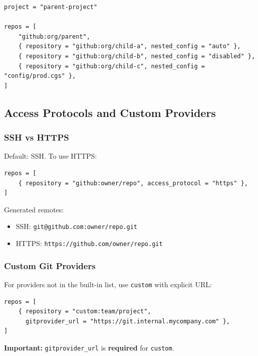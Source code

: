 \begin{lstlisting}
project = "parent-project"

repos = [
    "github:org/parent",
    { repository = "github:org/child-a", nested_config = "auto" },
    { repository = "github:org/child-b", nested_config = "disabled" },
    { repository = "github:org/child-c", nested_config = "config/prod.cgs" },
]
\end{lstlisting}

\subsection{Access Protocols and Custom Providers}
\label{subsec:cgs-protocols}

\subsubsection{SSH vs HTTPS}

Default: SSH. To use HTTPS:

\begin{lstlisting}
repos = [
    { repository = "github:owner/repo", access_protocol = "https" },
]
\end{lstlisting}

Generated remotes:

\begin{itemize}
  \item SSH: \texttt{git@github.com:owner/repo.git}
  \item HTTPS: \texttt{https://github.com/owner/repo.git}
\end{itemize}

\subsubsection{Custom Git Providers}

For providers not in the built-in list, use \texttt{custom} with explicit URL:

\begin{lstlisting}
repos = [
    { repository = "custom:team/project", 
      gitprovider_url = "https://git.internal.mycompany.com" },
]
\end{lstlisting}

\textbf{Important:} \texttt{gitprovider\_url} is \textbf{required} for \texttt{custom}.

